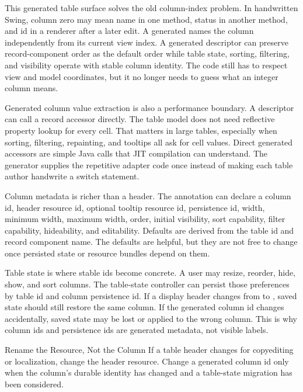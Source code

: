 This generated table surface solves the old  column-index problem.
In handwritten Swing, column zero may mean name in one method, status in
another method, and id in a renderer after a later edit. A generated
 names the column independently from its
current view index. A generated descriptor can preserve record-component order
as the default order while table state, sorting, filtering, and visibility
operate with stable column identity. The code still has to respect view and
model coordinates, but it no longer needs to guess what an integer column
means.

Generated column value extraction is also a performance boundary. A descriptor
can call a record accessor directly. The table model does not need reflective
property lookup for every cell. That matters in large tables, especially when
sorting, filtering, repainting, and tooltips all ask for cell values. Direct
generated accessors are simple Java calls that JIT compilation can understand.
The generator supplies the repetitive adapter code once instead of making each
table author handwrite a switch statement.

Column metadata is richer than a header. The  annotation can
declare a column id, header resource id, optional tooltip resource id,
persistence id, width, minimum width, maximum width, order, initial
visibility, sort capability, filter capability, hideability, and editability.
Defaults are derived from the table id and record component name. The defaults
are helpful, but they are not free to change once persisted state or resource
bundles depend on them.

Table state is where stable ids become concrete. A user may resize, reorder,
hide, show, and sort columns. The table-state controller can persist those
preferences by table id and column persistence id. If a display header changes
from  to , saved state should still restore the
same column. If the generated column id changes accidentally, saved state may
be lost or applied to the wrong column. This is why column ids and
persistence ids are generated metadata, not visible labels.

\begin{migrationbox}{Rename the Resource, Not the Column}
If a table header changes for copyediting or localization, change the header
resource. Change a generated column id only when the column's durable identity
has changed and a table-state migration has been considered.
\end{migrationbox}

